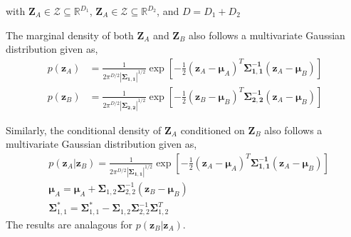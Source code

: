 with $\mathbf{Z}_A \in \mathcal{Z} \subseteq \mathbb{R}^{D_1}$, $\mathbf{Z}_A \in \mathcal{Z} \subseteq \mathbb{R}^{D_2}$, and $D = D_1 + D_2$ 

The marginal density of both $\mathbf{Z}_A$ and $\mathbf{Z}_B$ also follows a multivariate Gaussian distribution given as,
\begin{equation}
	\begin{split}
		p(\mathbf{z}_A) & = \frac{1}{2\pi^{D/2}|\boldsymbol{\Sigma_{1,1}}|^{1/2}} \exp{\left[-\frac{1}{2}(\mathbf{z}_A-\boldsymbol{\mu}_A)^T\boldsymbol{\Sigma^{-1}_{1,1}}(\mathbf{z}_A-\boldsymbol{\mu}_B)\right]} \\
		p(\mathbf{z}_B) & = \frac{1}{2\pi^{D/2}|\boldsymbol{\Sigma_{2,2}}|^{1/2}} \exp{\left[-\frac{1}{2}(\mathbf{z}_B-\boldsymbol{\mu}_B)^T\boldsymbol{\Sigma^{-1}_{2,2}}(\mathbf{z}_A-\boldsymbol{\mu}_B)\right]}
	\end{split}
\label{eq:gaussian_marginal}
\end{equation}

Similarly, the conditional density of $\mathbf{Z}_A$ conditioned on $\mathbf{Z}_B$ also follows a multivariate Gaussian distribution given as,
\begin{equation}
	\begin{split}
		& p(\mathbf{z}_A|\mathbf{z}_B) = \frac{1}{2\pi^{D/2}|\boldsymbol{\Sigma_{1,1}}|^{1/2}} \exp{\left[-\frac{1}{2}(\mathbf{z}_A-\boldsymbol{\mu}_A)^T\boldsymbol{\Sigma^{-1}_{1,1}}(\mathbf{z}_A-\boldsymbol{\mu}_B)\right]} \\
		& \boldsymbol{\mu}_A = \boldsymbol{\mu}_A + \boldsymbol{\Sigma}_{1,2} \boldsymbol{\Sigma}^{-1}_{2,2} \left(\mathbf{z}_B - \boldsymbol{\mu}_B \right) \\
		& \boldsymbol{\Sigma}^*_{1,1} = \boldsymbol{\Sigma}^*_{1,1} - \boldsymbol{\Sigma}_{1,2} \boldsymbol{\Sigma}^{-1}_{2,2} \boldsymbol{\Sigma}^T_{1,2} 
	\end{split}
\label{eq:gaussian_conditional}
\end{equation}
The results are analagous for $p(\mathbf{z}_B|\mathbf{z}_A)$. 
